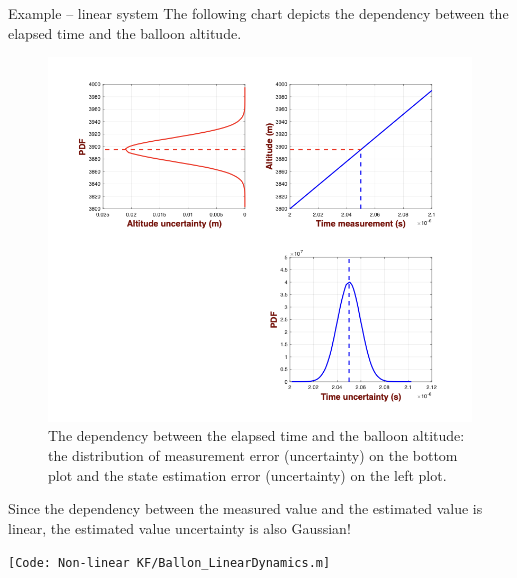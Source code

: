 \begin{frame}{Example – linear system}
The following chart depicts the dependency between the elapsed time and the balloon altitude.
\vspace{-10pt}
\begin{figure}
    \centering
    \includegraphics[width=0.6\linewidth]{Figures//Background3/Ballon_LinearDynamics_Results.png}
    \vspace{-15pt}
    \caption{The dependency between the elapsed time and the balloon altitude: the distribution of measurement error (uncertainty) on the bottom plot and the state estimation error (uncertainty) on the left plot.}
\end{figure}
Since the dependency between the measured value and the estimated value is linear, the estimated value uncertainty is also Gaussian!

\texttt{\tiny [Code: Non-linear KF/Ballon\_LinearDynamics.m]}
\end{frame}
